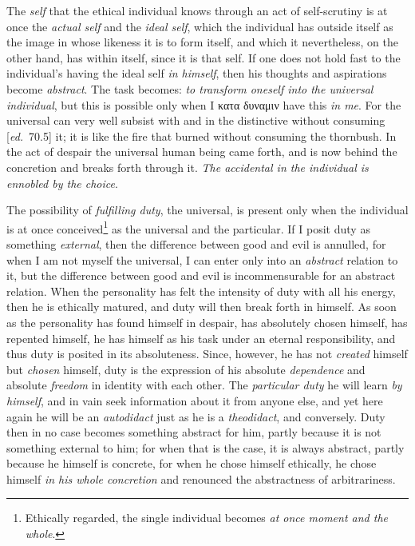\documentclass[12pt,a4paper,openany]{book}
\newcommand{\kpage}[1]{\marginnote{\footnotesize\textit{[#1]}}}
\newcommand{\ed}[1]{{\small[\textit{ed.}\ #1]}}
\begin{document}
The \emph{self} that the ethical individual knows through an act of
self-scrutiny is at once the \emph{actual self} and the \emph{ideal self},
which the individual has outside itself as the image in whose likeness it is to
form itself, and which it nevertheless, on the other hand, has within itself, since it is that
self. If one does not hold fast to the individual's having the ideal self \emph{in
himself}, then his thoughts and aspirations become \emph{abstract}. The task becomes: \emph{to
transform oneself into the universal individual}, but this is possible only when I
\kpage{134}κατα δυναμιν have this \emph{in me}. For the universal can very well subsist
with and in the distinctive without consuming \ed{70.5} it; it is like
the fire that burned without consuming the thornbush. In the
act of despair the universal human being came forth, and is now behind the concretion
and breaks forth through it. \emph{The accidental in the individual is ennobled by
the choice}.

The possibility of \emph{fulfilling duty}, the universal, is present only when
the individual is at once conceived\footnote[60]{
Ethically regarded, the single individual becomes \emph{at once moment and the whole}.}
as the universal and the particular.
If I posit duty as something \emph{external}, then the difference between
good and evil is annulled, for when I am not myself the universal, I can
enter only into an \emph{abstract} relation to it, but the difference between good
and evil is incommensurable for an abstract relation. When the personality
has felt the intensity of duty with all his energy, then he is
ethically matured, and duty will then break forth in himself. As soon as
the personality has found himself in despair, has absolutely chosen
himself, has repented himself, he has himself as his task under
an eternal responsibility, and thus duty is posited in its absoluteness. Since,
however, he has not \emph{created} himself but \emph{chosen} himself, duty is
the expression of his absolute \emph{dependence} and absolute \emph{freedom} in
identity with each other. The \emph{particular duty} he will learn \emph{by himself}, and in vain
seek information about it from anyone else, and yet here again he will
be an \emph{autodidact} just as he is a \emph{theodidact}, and conversely. Duty
then in no case becomes something abstract for him, partly because it is not
something external to him; for when that is the case, it is always abstract,
partly because he himself is concrete, for when he chose himself ethically, he chose
himself \emph{in his whole concretion} and renounced the abstractness of arbitrariness.
\end{document}
